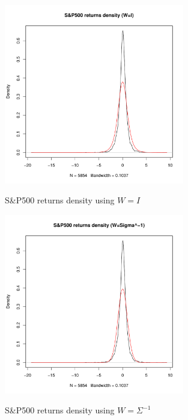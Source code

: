 \begin{figure}
    \centering
    \includegraphics[width=0.7\textwidth]{S&P500_returns_density_(W=I).pdf}
    \label{SP500_returns_density_I}
    \caption{S\&P500 returns density using $W=I$}
    \includegraphics[width=0.7\textwidth]{S&P500_returns_density_(W=Sigma^-1).pdf}
    \label{SP500_returns_density_W}
    \caption{S\&P500 returns density using $W=\Sigma^{-1}$}
\end{figure}
